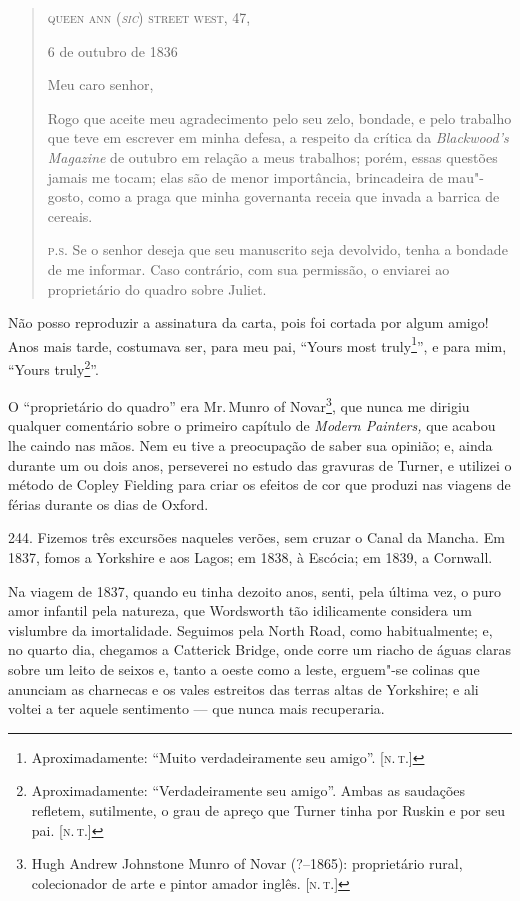 \begin{quote}
\hfill\textsc{queen ann (\emph{sic}) street west, 47,}

\hfill{}6 de outubro de 1836

Meu caro senhor,

Rogo que aceite meu agradecimento pelo seu zelo,
bondade, e pelo trabalho que teve em escrever em minha defesa, a
respeito da crítica da \emph{Blackwood's Magazine} de outubro em relação
a meus trabalhos; porém, essas questões jamais me tocam; elas são de
menor importância, brincadeira de mau"-gosto, como a praga que minha
governanta receia que invada a barrica de cereais.

\textsc{p.s.} Se o senhor deseja que seu manuscrito seja devolvido, tenha a
bondade de me informar. Caso contrário, com sua permissão, o enviarei ao
proprietário do quadro sobre Juliet.
\end{quote}

Não posso reproduzir a assinatura da carta, pois foi cortada por algum
amigo! Anos mais tarde, costumava ser, para meu pai, ``Yours most
truly\footnote{Aproximadamente: ``Muito verdadeiramente seu amigo''.
  {[}\textsc{n.\,t.}{]}}'', e para mim, ``Yours truly\footnote{Aproximadamente:
  ``Verdadeiramente seu amigo''. Ambas as saudações refletem,
  sutilmente, o grau de apreço que Turner tinha por Ruskin e por seu pai.
  {[}\textsc{n.\,t.}{]}}''.

O ``proprietário do quadro'' era Mr.\,Munro of Novar\footnote{Hugh Andrew
  Johnstone Munro of Novar (?--1865): proprietário rural, colecionador de
  arte e pintor amador inglês. {[}\textsc{n.\,t.}{]}}, que nunca me dirigiu
qualquer comentário sobre o primeiro capítulo de \emph{Modern Painters,}
que acabou lhe caindo nas mãos. Nem eu tive a preocupação de saber sua
opinião; e, ainda durante um ou dois anos, perseverei no estudo das
gravuras de Turner, e utilizei o método de Copley Fielding para criar os
efeitos de cor que produzi nas viagens de férias durante os dias de
Oxford.

244. Fizemos três excursões naqueles verões, sem cruzar o Canal da
Mancha. Em 1837, fomos a Yorkshire e aos Lagos; em 1838, à Escócia; em
1839, a Cornwall.

Na viagem de 1837, quando eu tinha dezoito anos, senti, pela última vez,
o puro amor infantil pela natureza, que Wordsworth tão idilicamente
considera um vislumbre da imortalidade. Seguimos pela North Road, como
habitualmente; e, no quarto dia, chegamos a Catterick Bridge, onde corre
um riacho de águas claras sobre um leito de seixos e, tanto a oeste como
a leste, erguem"-se colinas que anunciam as charnecas e os vales
estreitos das terras altas de Yorkshire; e ali voltei a ter aquele
sentimento --- que nunca mais recuperaria.

